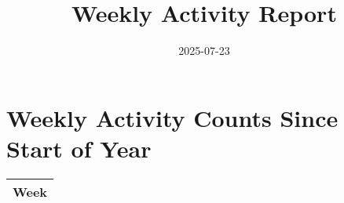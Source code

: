 \documentclass{article}%
\title{Weekly Activity Report}%
\date{2025-07-23}%
\begin{document}
%
\normalsize%
\maketitle%
\section{Weekly Activity Counts Since Start of Year}%
\label{sec:WeeklyActivityCountsSinceStartofYear}%


\begin{table}%
\begin{tabular}{c}%
Week\\%
\hline%
\end{tabular}%
\end{table}

%
\end{document}

